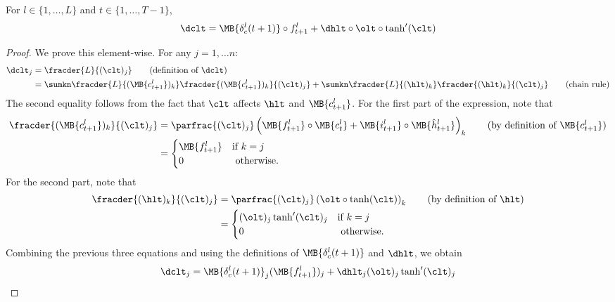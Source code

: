 \begin{lemma}
For $l \in \{1,\dots, L\}$ and $t \in \{1, \dots, T-1\}$,
\begin{equation}
\dclt = \MB{\delta_c^l(t+1)} \circ f^l_{t+1} + \dhlt \circ \olt \circ \tanh'(\clt)
\end{equation}
\end{lemma}
\begin{proof}
We prove this element-wise. For any $j=1,\dots n$:
\begin{align}
\dclt_j &= \fracder{L}{(\clt)_j} \tag{definition of $\dclt$}\\
&= \sumkn \fracder{L}{(\MB{c_{t+1}^l})_k} \fracder{(\MB{c_{t+1}^l})_k}{(\clt)_j} + \sumkn \fracder{L}{(\hlt)_k} \fracder{(\hlt)_k}{(\clt)_j} \tag{chain rule} 
\end{align}
The second equality follows from the fact that $\clt$ affects $\hlt$ and $\MB{c_{t+1}^l}$.
For the first part of the expression, note that
\begin{align*}
 \fracder{(\MB{c_{t+1}^l})_k}{(\clt)_j}
&= \parfrac{(\clt)_j} \left( \MB{f^l_{t+1}} \circ \MB{c^l_{t}} + \MB{i^l_{t+1}}  \circ \MB{\hat{h}^l_{t+1}}  \right)_k \tag{by definition of $\MB{c_{t+1}^l}$} \\
&= 
\begin{cases} 
\MB{f^l_{t+1}}  &\mbox{if } k=j \\
0 &\mbox{ otherwise.}
\end{cases} 
\end{align*}
For the second part, note that
\begin{align*}
\fracder{(\hlt)_k}{(\clt)_j} 
&= \parfrac{(\clt)_j} \left( \olt \circ \tanh(\clt) \right)_k \tag{by definition of $\hlt$} \\
&= 
\begin{cases} 
(\olt)_j \tanh'(\clt)_j &\mbox{if } k=j \\
0 &\mbox{ otherwise.}
\end{cases} 
\end{align*}
Combining the previous three equations and using the definitions of $\MB{\delta_c^l(t+1)}$ and $\dhlt$, we obtain
\begin{align}
\dclt_j = \MB{\delta_c^l(t+1)}_j (\MB{f^l_{t+1}})_j + \dhlt_j (\olt)_j \tanh'(\clt)_j 
\end{align}
\end{proof}

